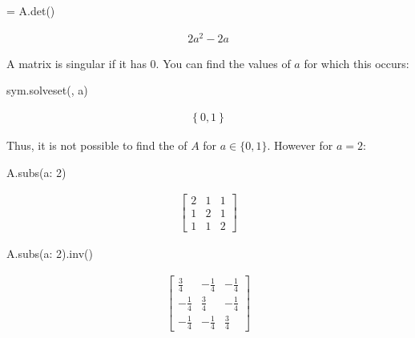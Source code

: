 \begin{pyin}
 = A.det()
\end{pyin}




\begin{equation*}
\begin{split}\displaystyle 2 a^{2} - 2 a\end{split}
\end{equation*}




A matrix is singular if it has  0. You can find the values of \(a\) for
which this occurs:




\begin{pyin}
sym.solveset(, a)
\end{pyin}




\begin{equation*}
\begin{split}\displaystyle \left\{0, 1\right\}\end{split}
\end{equation*}

Thus, it is not possible to find the  of \(A\) for \(a\in\{0, 1\}\).
However for \(a = 2\):




\begin{pyin}
A.subs({a: 2})
\end{pyin}




\begin{equation*}
\begin{split}\displaystyle \left[\begin{matrix}2 & 1 & 1\\1 & 2 & 1\\1 & 1 & 2\end{matrix}\right]\end{split}
\end{equation*}






\begin{pyin}
A.subs({a: 2}).inv()
\end{pyin}




\begin{equation*}
\begin{split}\displaystyle \left[\begin{matrix}\frac{3}{4} & - \frac{1}{4} & - \frac{1}{4}\\- \frac{1}{4} & \frac{3}{4} & - \frac{1}{4}\\- \frac{1}{4} & - \frac{1}{4} & \frac{3}{4}\end{matrix}\right]\end{split}
\end{equation*}




